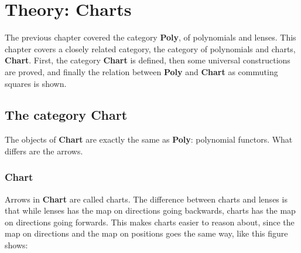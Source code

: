 \chapter{Theory: Charts}\label{chapter:charts}
The previous chapter covered the category \textbf{Poly}, of polynomials and lenses. This chapter covers a closely related category, the category of polynomials and charts, \textbf{Chart}. First, the category \textbf{Chart} is defined, then some universal constructions are proved, and finally the relation between \textbf{Poly} and \textbf{Chart} as commuting squares is shown.

\section{The category \textbf{Chart}}
The objects of \textbf{Chart} are exactly the same as \textbf{Poly}: polynomial functors. What differs are the arrows. 

\subsection{Chart}
Arrows in \textbf{Chart} are called charts. The difference between charts and lenses is that while lenses has the map on directions going backwards, charts has the map on directions going forwards. This makes charts easier to reason about, since the map on directions and the map on positions goes the same way, like this figure shows:

